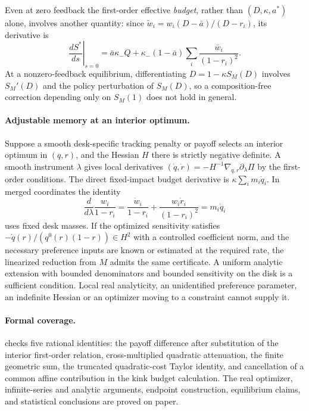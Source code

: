 \documentclass[12pt]{article}
\theoremstyle{definition}
\theoremstyle{remark}
\begin{document}
Even at zero feedback the first-order effective \emph{budget}, rather than
$(D,\kappa,a^*)$ alone, involves another quantity: since
$\tilde w_i=w_i(D-\bar a)/(D-r_i)$, its derivative is
\[
 \left.\frac{d S^*}{ds}\right|_{s=0}
   =\bar a\kappa_- Q + \kappa_-(1-\bar a)
                  \sum_i \frac{\bar w_i}{(1-r_i)^2}.
\]
At a nonzero-feedback equilibrium, differentiating $D=1-\kappa S_M(D)$ involves
$S_M'(D)$ and the policy perturbation of $S_M(D)$, so a composition-free correction
depending only on $S_M(1)$ does not hold in general.

\paragraph{Adjustable memory at an interior optimum.}
Suppose a smooth desk-specific tracking penalty or payoff selects an interior
optimum in $(q,r)$, and the Hessian $H$ there is strictly negative definite. A smooth
instrument $\lambda$ gives local derivatives $(\dot q,\dot r)=-H^{-1}
\nabla_{q,r}\partial_\lambda \Pi$ by the first-order conditions. The direct
fixed-impact budget derivative is $\kappa\sum_i m_i\dot q_i$. In merged coordinates
the identity
\[
 \frac{d}{d\lambda}\frac{w_i}{1-r_i}
   =\frac{\dot w_i}{1-r_i}+\frac{w_i\dot r_i}{(1-r_i)^2}=m_i\dot q_i
\]
uses fixed desk masses. If the optimized sensitivity satisfies
$-\dot q(r)/(q^0(r)(1-r))\in H^2$ with a controlled coefficient norm, and the
necessary preference inputs are known or estimated at the required rate, the
linearized reduction from $M$ admits the same certificate. A uniform analytic
extension with bounded denominators and bounded sensitivity on the disk is a
sufficient condition. Local real analyticity, an unidentified preference parameter,
an indefinite Hessian or an optimizer moving to a constraint cannot supply it.

\paragraph{Formal coverage.}
 checks five rational identities:
the payoff difference after substitution of the interior first-order relation,
cross-multiplied quadratic attenuation, the finite geometric sum, the truncated quadratic-cost Taylor identity, and
cancellation of a common affine contribution in the kink budget calculation.
The real optimizer, infinite-series and analytic arguments, endpoint construction,
equilibrium claims, and statistical conclusions are proved on paper.
\end{document}
